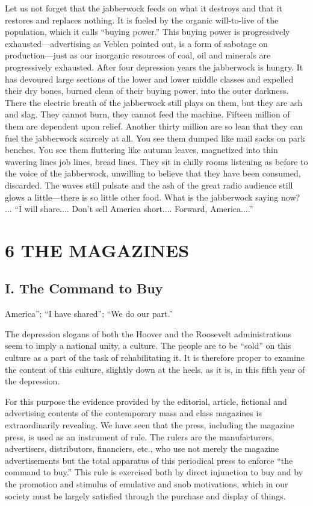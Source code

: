 \documentclass[twoside,nohyper,openany,nobib]{tufte-book}
\let\oldchapter\chapter
\def\chapter{%
  \setcounter{footnote}{0}%
  \oldchapter
}
\begin{document}
Let us not forget that the jabberwock feeds on what it destroys and that
it restores and replaces nothing. It is fueled by the organic
will-to-live of the population, which it calls ``buying power.'' This
buying power is progressively exhausted---advertising as Veblen pointed
out, is a form of sabotage on production---just as our inorganic
resources of coal, oil and minerals are progressively exhausted. After
four depression years the jabberwock is hungry. It has devoured large
sections of the lower and lower middle classes and expelled their dry
bones, burned clean of their buying power, into the outer darkness.
There the electric breath of the jabberwock still plays on them, but
they are ash and slag. They cannot burn, they cannot feed the machine.
Fifteen million of them are dependent upon relief. Another thirty
million are so lean that they can fuel the jabberwock scarcely at all.
You see them dumped like mail sacks on park benches. You see them
fluttering like autumn leaves, magnetized into thin wavering lines job
lines, bread lines. They sit in chilly rooms listening as before to the
voice of the jabberwock, unwilling to believe that they have been
consumed, discarded. The waves still pulsate and the ash of the great
radio audience still glows a little---there is so little other food.
What is the jabberwock saying now? ... ``I will share.... Don't sell
America short.... Forward, America....''



\chapter[6 \hspace*{1mm} THE MAGAZINES]{6 THE MAGAZINES}

\section{I. The Command to Buy}

 America''; ``I have shared''; ``We do our part.''

The depression slogans of both the Hoover and the Roosevelt
administrations seem to imply a national unity, a culture. The people
are to be ``sold'' on this culture as a part of the task of
rehabilitating it. It is therefore proper to examine the content of this
culture, slightly down at the heels, as it is, in this fifth year of the
depression.

For this purpose the evidence provided by the editorial, article,
fictional and advertising contents of the contemporary mass and class
magazines is extraordinarily revealing. We have seen that the press,
including the magazine press, is used as an instrument of rule. The
rulers are the manufacturers, advertisers, distributors, financiers,
etc., who use not merely the magazine advertisements but the total
apparatus of this periodical press to enforce ``the command to buy.''
This rule is exercised both by direct injunction to buy and by the
promotion and stimulus of emulative and snob motivations, which in our
society must be largely satisfied through the purchase and display of
things.
\end{document}
